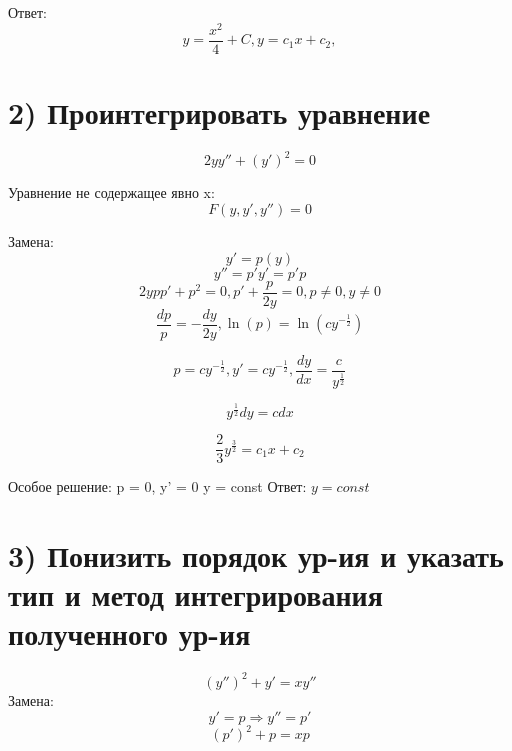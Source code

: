 \documentclass{article}
\begin{document}
Ответ: 
\begin{equation*}
    y = \frac{x^2}{4} + C,
    y = c_1x+c_2,  
\end{equation*}

\section*{2) Проинтегрировать уравнение}
\begin{equation*}
    2yy'' + (y')^2 = 0
\end{equation*}

Уравнение не содержащее явно x:
\begin{equation*}
    F(y, y', y'') = 0
\end{equation*}

Замена:
\begin{equation*}
    y' = p(y) 
\end{equation*}
\begin{equation*}
    y'' = p'y' = p'p
\end{equation*}
\begin{equation*}
    2ypp' + p^2 = 0, p' + \frac{p}{2y} = 0, p \ne 0 , y \ne 0
\end{equation*}
\begin{equation*}
    \frac{dp}{p} = -\frac{dy}{2y} , \ln{(p)} = \ln{(cy^{-\frac{1}{2}})}
\end{equation*}

\begin{equation*}
    p = c y^{-\frac{1}{2}}, y' = cy^{-\frac{1}{2}}, \frac{dy}{dx} = \frac{c}{y^{\frac{1}{2}}}
\end{equation*}

\begin{equation*}
    y^{\frac{1}{2}}dy = cdx
\end{equation*}

\begin{equation*}
    \frac{2}{3}y^{\frac{3}{2}} = c_1x + c_2
\end{equation*}

Особое решение:
p = 0, y' = 0 \Rightarrow y = const
Ответ: $ y = const$

\section*{3) Понизить порядок ур-ия и указать тип и метод интегрирования полученного ур-ия}
\begin{equation*}
    (y'')^2 + y' = xy''
\end{equation*}
Замена:
\begin{equation*}
    y' = p \Rightarrow y'' = p'
\end{equation*}
\begin{equation*}
    (p')^2 + p = xp
\end{equation*}
\end{document}
